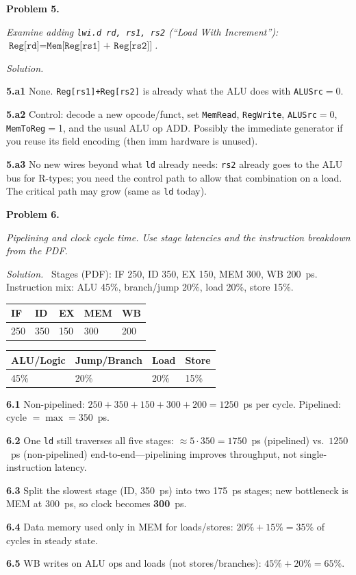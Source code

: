 \documentclass[12pt]{article}
\newcommand{\problem}[1]{\vspace{0.8em}\noindent\textbf{Problem #1.}\vspace{0.35em}}
\newenvironment{solution}{\par\noindent\textit{Solution.}\ }{\par\vspace{1.1em}}
\newcommand{\subproblem}[1]{\par\vspace{0.45em}\noindent\textbf{#1}\quad}
\newcommand{\assigntext}[1]{\par\vspace{0.25em}\small\textit{#1}\par\vspace{0.35em}}
\begin{document}
\problem{5}
\assigntext{Examine adding \texttt{lwi.d rd, rs1, rs2} (``Load With Increment''): $\texttt{Reg[rd]} = \texttt{Mem[Reg[rs1] + Reg[rs2]]}$.}

\begin{solution}
\subproblem{5.a1}
None. \texttt{Reg[rs1]+Reg[rs2]} is already what the ALU does with \texttt{ALUSrc}$=$0.

\subproblem{5.a2}
Control: decode a new opcode/funct, set \texttt{MemRead}, \texttt{RegWrite}, \texttt{ALUSrc}$=$0, \texttt{MemToReg}$=$1, and the usual ALU op ADD. Possibly the immediate generator if you reuse its field encoding (then imm hardware is unused).

\subproblem{5.a3}
No new wires beyond what \texttt{ld} already needs: \texttt{rs2} already goes to the ALU bus for R-types; you need the control path to allow that combination on a load. The critical path may grow (same as \texttt{ld} today).
\end{solution}

\problem{6}
\assigntext{Pipelining and clock cycle time. Use stage latencies and the instruction breakdown from the PDF.}

\begin{solution}
Stages (PDF): IF 250, ID 350, EX 150, MEM 300, WB 200~ps. Instruction mix: ALU 45\%, branch/jump 20\%, load 20\%, store 15\%.

\begin{center}
\begin{tabular}{@{}lllll@{}}
\toprule
IF & ID & EX & MEM & WB \\
\midrule
250 & 350 & 150 & 300 & 200 \\
\bottomrule
\end{tabular}
\qquad
\begin{tabular}{@{}llll@{}}
\toprule
ALU/Logic & Jump/Branch & Load & Store \\
\midrule
45\% & 20\% & 20\% & 15\% \\
\bottomrule
\end{tabular}
\end{center}

\subproblem{6.1}
Non-pipelined: $250+350+150+300+200=1250$~ps per cycle. Pipelined: cycle $=\max=350$~ps.

\subproblem{6.2}
One \texttt{ld} still traverses all five stages: $\approx 5\cdot350=1750$~ps (pipelined) vs.\ $1250$~ps (non-pipelined) end-to-end---pipelining improves throughput, not single-instruction latency.

\subproblem{6.3}
Split the slowest stage (ID, 350~ps) into two 175~ps stages; new bottleneck is MEM at 300~ps, so clock becomes \textbf{300}~ps.

\subproblem{6.4}
Data memory used only in MEM for loads/stores: $20\%+15\%=35\%$ of cycles in steady state.

\subproblem{6.5}
WB writes on ALU ops and loads (not stores/branches): $45\%+20\%=65\%$.
\end{solution}
\end{document}
